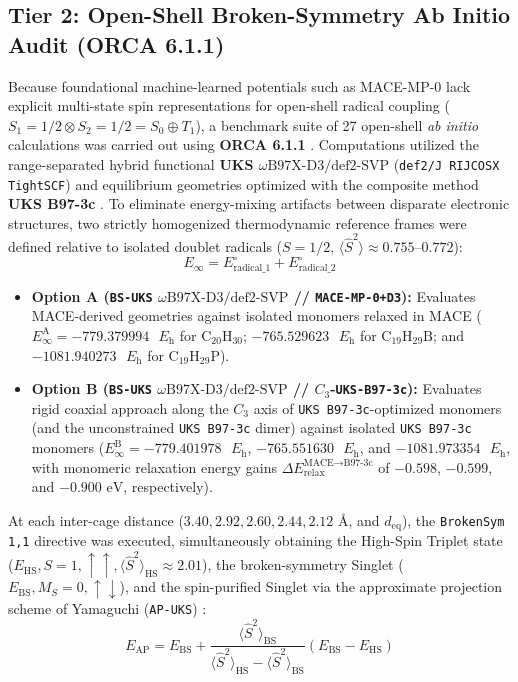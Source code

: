 \documentclass[10pt,twocolumn,a4paper]{article}
\begin{document}
\subsection{Tier 2: Open-Shell Broken-Symmetry Ab Initio Audit (ORCA 6.1.1)}
Because foundational machine-learned potentials such as MACE-MP-0 lack explicit multi-state spin representations for open-shell radical coupling ($S_1 = 1/2 \otimes S_2 = 1/2 = S_0 \oplus T_1$), a benchmark suite of 27 open-shell \textit{ab initio} calculations was carried out using \textbf{ORCA 6.1.1} \cite{Neese2022}. Computations utilized the range-separated hybrid functional \textbf{UKS $\omega\text{B97X-D3/def2-SVP}$} (\texttt{def2/J RIJCOSX TightSCF}) \cite{Chai2013} and equilibrium geometries optimized with the composite method \textbf{UKS B97-3c} \cite{Brandenburg2018}. To eliminate energy-mixing artifacts between disparate electronic structures, two strictly homogenized thermodynamic reference frames were defined relative to isolated doublet radicals ($S=1/2$, $\langle \hat{S}^2 \rangle \approx 0.755\text{--}0.772$):
\begin{equation}
    E_\infty = E_{\text{radical\_1}}^\circ + E_{\text{radical\_2}}^\circ
\end{equation}
\begin{itemize}
    \item \textbf{Option A (\texttt{BS-UKS} $\omega\text{B97X-D3/def2-SVP}$ // \texttt{MACE-MP-0+D3}):} Evaluates MACE-derived geometries against isolated monomers relaxed in MACE ($E_\infty^{\text{A}} = -779.379994\text{ }E_{\text{h}}$ for $\text{C}_{20}\text{H}_{30}$; $-765.529623\text{ }E_{\text{h}}$ for $\text{C}_{19}\text{H}_{29}\text{B}$; and $-1081.940273\text{ }E_{\text{h}}$ for $\text{C}_{19}\text{H}_{29}\text{P}$).
    \item \textbf{Option B (\texttt{BS-UKS} $\omega\text{B97X-D3/def2-SVP}$ // $C_3$-\texttt{UKS-B97-3c}):} Evaluates rigid coaxial approach along the $C_3$ axis of \texttt{UKS B97-3c}-optimized monomers (and the unconstrained \texttt{UKS B97-3c} dimer) against isolated \texttt{UKS B97-3c} monomers ($E_\infty^{\text{B}} = -779.401978\text{ }E_{\text{h}}$, $-765.551630\text{ }E_{\text{h}}$, and $-1081.973354\text{ }E_{\text{h}}$, with monomeric relaxation energy gains $\Delta E_{\text{relax}}^{\text{MACE}\to\text{B97-3c}}$ of $-0.598$, $-0.599$, and $-0.900\text{ eV}$, respectively).
\end{itemize}
At each inter-cage distance ($3.40, 2.92, 2.60, 2.44, 2.12\text{ \AA}$, and $d_{\text{eq}}$), the \texttt{BrokenSym 1,1} directive was executed, simultaneously obtaining the High-Spin Triplet state ($E_{\text{HS}}, S=1, \uparrow\uparrow, \langle \hat{S}^2 \rangle_{\text{HS}} \approx 2.01$), the broken-symmetry Singlet ($E_{\text{BS}}, M_S=0, \uparrow\downarrow$), and the spin-purified Singlet via the approximate projection scheme of Yamaguchi (\texttt{AP-UKS}) \cite{Yamaguchi1988}:
\begin{equation}
    E_{\text{AP}} = E_{\text{BS}} + \frac{\langle \hat{S}^2 \rangle_{\text{BS}}}{\langle \hat{S}^2 \rangle_{\text{HS}} - \langle \hat{S}^2 \rangle_{\text{BS}}} \left(E_{\text{BS}} - E_{\text{HS}}\right)
\end{equation}
\end{document}
